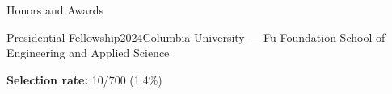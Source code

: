 \documentclass[letterpaper, 12pt]{resume}
\begin{document}
\begin{rSection}{Honors and Awards}
    \begin{rSubsection}{Presidential Fellowship}{2024}{Columbia University --- Fu Foundation School of Engineering and Applied Science}{}
        \item \textbf{Selection rate:} 10/700 (1.4\%)
    \end{rSubsection}
\end{rSection}




\end{document}
